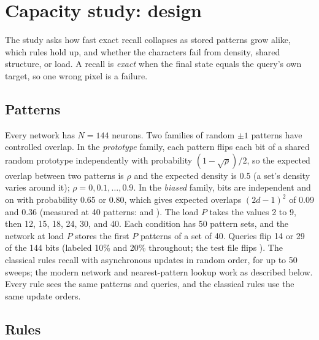 \section{Capacity study: design}
\label{sec:design}

The study asks how fast exact recall collapses as stored patterns grow alike, which rules hold up, and whether the characters fail from density, shared structure, or load. A recall is \emph{exact} when the final state equals the query's own target, so one wrong pixel is a failure.

\subsection{Patterns}

Every network has $N = 144$ neurons. Two families of random $\pm 1$ patterns have controlled overlap. In the \emph{prototype} family, each pattern flips each bit of a shared random prototype independently with probability $(1 - \sqrt{\rho})/2$, so the expected overlap between two patterns is $\rho$ and the expected density is 0.5 (a set's density varies around it); $\rho = 0, 0.1, \dots, 0.9$. In the \emph{biased} family, bits are independent and on with probability 0.65 or 0.80, which gives expected overlaps $(2d-1)^2$ of 0.09 and 0.36 (measured at 40 patterns:  and ). The load $P$ takes the values 2 to 9, then 12, 15, 18, 24, 30, and 40. Each condition has 50 pattern sets, and the network at load $P$ stores the first $P$ patterns of a set of 40. Queries flip 14 or 29 of the 144 bits (labeled 10\% and 20\% throughout; the test file flips ). The classical rules recall with asynchronous updates in random order, for up to 50 sweeps; the modern network and nearest-pattern lookup work as described below. Every rule sees the same patterns and queries, and the classical rules use the same update orders.

\subsection{Rules}

